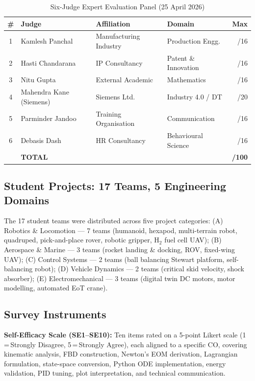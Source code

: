 \documentclass[12pt, a4paper]{article}
\begin{document}
\begin{table}[ht]
\centering
\caption{Six-Judge Expert Evaluation Panel (25 April 2026)}
\label{tab:judges}
\begin{tabular}{clllr}
\toprule
\textbf{\#} & \textbf{Judge} & \textbf{Affiliation} &
\textbf{Domain} & \textbf{Max} \\
\midrule
1 & Kamlesh Panchal         & Manufacturing Industry & Production Engg.    & /16 \\
2 & Hasti Chandarana         & IP Consultancy         & Patent \& Innovation & /16 \\
3 & Nitu Gupta               & External Academic      & Mathematics          & /16 \\
4 & Mahendra Kane (Siemens)  & Siemens Ltd.           & Industry 4.0 / DT    & /20 \\
5 & Parminder Jandoo         & Training Organisation  & Communication        & /16 \\
6 & Debasis Dash             & HR Consultancy         & Behavioural Science  & /16 \\
\midrule
  & \textbf{TOTAL}           &                        &                      & \textbf{/100} \\
\bottomrule
\end{tabular}
\end{table}

\subsection{Student Projects: 17 Teams, 5 Engineering Domains}

The 17 student teams were distributed across five project
categories: (A) Robotics \& Locomotion --- 7 teams (humanoid,
hexapod, multi-terrain robot, quadruped, pick-and-place rover,
robotic gripper, H$_2$ fuel cell UAV); (B) Aerospace \& Marine
--- 3 teams (rocket landing \& docking, ROV, fixed-wing UAV);
(C) Control Systems --- 2 teams (ball balancing Stewart platform,
self-balancing robot); (D) Vehicle Dynamics --- 2 teams (critical
skid velocity, shock absorber); (E) Electromechanical --- 3 teams
(digital twin DC motors, motor modelling, automated EoT crane).

\subsection{Survey Instruments}

\textbf{Self-Efficacy Scale (SE1--SE10):} Ten items rated on a
5-point Likert scale (1\,=\,Strongly Disagree, 5\,=\,Strongly
Agree), each aligned to a specific CO, covering kinematic
analysis, FBD construction, Newton's EOM derivation, Lagrangian
formulation, state-space conversion, Python ODE implementation,
energy validation, PID tuning, plot interpretation, and technical
communication.
\end{document}
